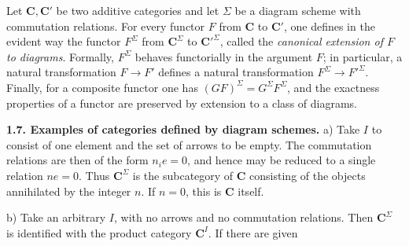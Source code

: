 Let $\mathbf{C},\mathbf{C}'$ be two additive categories and let $\Sigma$ be a diagram scheme
with commutation relations. For every functor $F$ from $\mathbf{C}$ to $\mathbf{C}'$, one
defines in the evident way the functor $F^\Sigma$ from $\mathbf{C}^\Sigma$ to
$\mathbf{C}'^\Sigma$, called the \textit{canonical extension of $F$ to diagrams}.
Formally, $F^\Sigma$ behaves functorially in the argument $F$; in particular,
a natural transformation $F\to F'$ defines a natural
transformation $F^\Sigma\to F'^\Sigma$. Finally, for a composite
functor one has $(GF)^\Sigma=G^\Sigma F^\Sigma$, and the exactness properties of a functor are preserved by
extension to a class of diagrams.

\textbf{1.7. Examples of categories defined by diagram schemes.}
a) Take $I$ to consist of one element and the set of arrows to be
empty. The commutation relations are then of the form $n_i e=0$, and hence
may be reduced to a single relation $ne=0$. Thus $\mathbf{C}^\Sigma$ is the subcategory
of $\mathbf{C}$ consisting of the objects annihilated by the integer $n$. If $n=0$,
this is $\mathbf{C}$ itself.

b) Take an arbitrary $I$, with no arrows and no commutation
relations. Then $\mathbf{C}^\Sigma$ is identified with the product category $\mathbf{C}^I$. If
there are given

